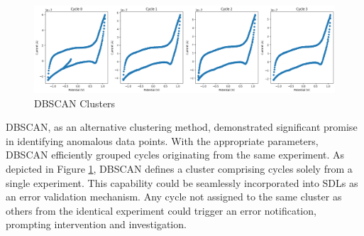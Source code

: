 \begin{figure}[h!]
  \centering
    \includegraphics[width=1.0\textwidth]{figures/dbscan_results.png}
    \caption{DBSCAN Clusters}
    \label{dbscan_results}
\end{figure}
DBSCAN, as an alternative clustering method, demonstrated significant promise in identifying anomalous data points. With the appropriate parameters, DBSCAN efficiently grouped cycles originating from the same experiment. As depicted in Figure \ref{dbscan_results}, DBSCAN defines a cluster comprising cycles solely from a single experiment. This capability could be seamlessly incorporated into SDLs as an error validation mechanism. Any cycle not assigned to the same cluster as others from the identical experiment could trigger an error notification, prompting intervention and investigation.

